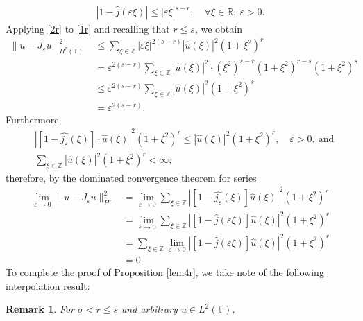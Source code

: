 \documentclass[12pt,reqno]{amsart}
\newcommand{\rr}{\mathbb{R}}
\newcommand{\zz}{\mathbb{Z}}
\newcommand{\ci}{\mathbb{T}}
\newcommand{\ee}{\varepsilon}
\theoremstyle{plain}  %
\newtheorem{remark}{Remark}
\theoremstyle{definition}
\begin{document}
\begin{appendices}
\begin{equation}
\begin{split}
		|1 - \widehat{ j }(\ee \xi)| \le |\ee \xi |^{s-r}, \quad \forall
		\xi \in \rr, \ \ee > 0.
		\label{2r}
	\end{split}
\end{equation}
Applying \eqref{2r} to \eqref{1r} and recalling that $r \le s$, we obtain
\begin{equation}
	\label{2pr}
	\begin{split}
	\|u - J_\ee u\|_{H^r(\ci)}^2 
	& \le \sum_{\xi \in \zz}  |\ee \xi |^{2(s-r)}
	|\widehat{u}(\xi)|^2 (1 + \xi^2)^r
	\\
	& = \ee^{2(s-r)} \sum_{\xi \in \zz} |\widehat{u}(\xi)|^2  \cdot (\xi^2)^{s-r}
	(1 + \xi^2)^{r-s} (1 + \xi^2)^{s}
	\\
	& \le \ee^{2(s-r)}
	\sum_{\xi \in \zz} |\widehat{u}(\xi)|^2 (1 + \xi^2)^s
	\\
	& =  \ee^{2(s-r)}.
	\end{split}
\end{equation}
Furthermore,
\begin{equation*}
	\begin{split}
		& |[1- \widehat{j_\ee}(\xi)] \cdot \widehat{u}(\xi)|^2 (1 + \xi^2)^r \le
		|\widehat{u}(\xi)|^2 (1 + \xi^2)^r, \quad \ee > 0, \ \text{and}
		\\
		& \sum_{\xi \in \zz} |\widehat{u}(\xi)|^2 (1 + \xi^2)^r < \infty;
	\end{split}
\end{equation*}
therefore, by the dominated convergence theorem for series
\begin{equation}
	\label{o1}
	\begin{split}
		\lim_{\ee \to 0} \|u - J_\ee u \|_{H^r }^2 
		& = \lim_{\ee \to 0} \sum_{\xi \in \zz} |[1-\widehat{j_\ee}(\xi)]
		\widehat{u}(\xi) |^2 (1 + \xi^2)^r
		\\
		& = \lim_{\ee \to 0} \sum_{\xi \in \zz} |[1-\widehat{j}(\ee \xi)]
		\widehat{u}(\xi) |^2 (1 + \xi^2)^r
		\\
		& = \sum_{\xi \in \zz} \lim_{\ee \to 0} |[1-\widehat{j}(\ee \xi)]
		\widehat{u}(\xi) |^2 (1 + \xi^2)^r
		\\
		& = 0.
	\end{split}
\end{equation}
To complete the proof of Proposition \ref{lem4r}, we take note of the following interpolation result:
\begin{remark}
	\label{lem2r}
	For $\sigma < r \le s$ and arbitrary $u \in L^2(\ci)$,
	\begin{equation}
		\begin{split}

\end{split}
\end{equation}
\end{remark}
\end{appendices}
\end{document}
